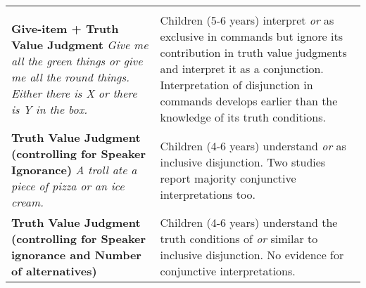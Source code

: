 \documentclass[,man,floatsintext]{apa6}
\begin{document}
\begin{longtable}[]{@{}ll@{}}
\begin{minipage}[t]{0.52\columnwidth}
\end{minipage}\tabularnewline
\begin{minipage}[t]{0.42\columnwidth}\raggedright
\textbf{Give-item + Truth Value Judgment} \newline \textit{Give me all the green things or give me all the round things.} \newline \textit{Either there is X or there is Y in the box.}\strut
\end{minipage} & \begin{minipage}[t]{0.52\columnwidth}\raggedright
Children (5-6 years) interpret \emph{or} as exclusive in commands but ignore its contribution in truth value judgments and interpret it as a conjunction. Interpretation of disjunction in commands develops earlier than the knowledge of its truth conditions.\strut
\end{minipage}\tabularnewline
\begin{minipage}[t]{0.42\columnwidth}\raggedright
\textbf{Truth Value Judgment (controlling for Speaker Ignorance)} \newline \textit{A troll ate a piece of pizza or an ice cream.}\strut
\end{minipage} & \begin{minipage}[t]{0.52\columnwidth}\raggedright
Children (4-6 years) understand \emph{or} as inclusive disjunction. Two studies report majority conjunctive interpretations too.\strut
\end{minipage}\tabularnewline
\begin{minipage}[t]{0.42\columnwidth}\raggedright
\textbf{Truth Value Judgment (controlling for Speaker ignorance and Number of alternatives)}\strut
\end{minipage} & \begin{minipage}[t]{0.52\columnwidth}\raggedright
Children (4-6 years) understand the truth conditions of \emph{or} similar to inclusive disjunction. No evidence for conjunctive interpretations.\strut
\end{minipage}\tabularnewline
\bottomrule
\end{longtable}
\end{document}
